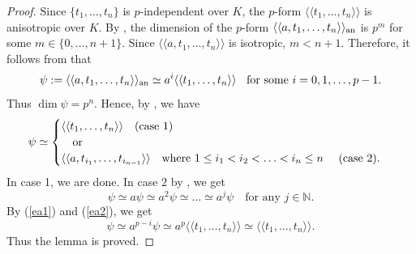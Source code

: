 \documentclass[times,10pt]{amsart}
\newcommand{\N}{\ensuremath{\mathbb{N}}}
\renewcommand{\cong}{\simeq}
\begin{document}
{\begin{proof}
    Since $ \{t_1,\ldots, t_n\}$ is  $p$-independent over $K$, the $p$-form $\langle\langle t_1,\ldots,t_n\rangle\rangle$ is anisotropic over $K$.   By \cite[ Corollary 4.10]{Hoffmann1},  the dimension of the $p$-form $\langle\langle a,t_1,\ldots,t_n\rangle\rangle_{\rm an}$  is  $p^m$ for some $m\in \{0,\ldots,n+1\}$.  Since $\langle\langle a,t_1,\ldots,t_n\rangle\rangle$  is isotropic, $m<n+1$.  Therefore, {it follows from  \cite[Proposition 4.19]{Hoffmann1}  that }  \begin{equation}\label{ea1} \psi:=\langle\langle a, t_1,\ldots, t_n\rangle\rangle_{\rm an}\cong   a^i \langle \langle t_1,\ldots,t_n\rangle\rangle \hspace{2mm} \text{ for some $i=0,1,\ldots,p-1$}.\end{equation}
Thus $\dim \psi=p^n$. Hence, by \cite[Corollary 4.10]{Hoffmann1}, we have \begin{align*}
    \psi\cong \begin{cases}
        \langle\langle t_1,\ldots, t_n\rangle\rangle\quad \text{(case 1)}\\ \quad \text{or} \\
        \langle\langle a, t_{i_1},\ldots, t_{i_{n-1}}\rangle\rangle\quad \text{where $1\leq i_1<i_2<\ldots<i_n\leq n$ \quad (case 2).}
    \end{cases} 
\end{align*} In case 1, we are done.  In case $2$ by \cite[Proposition 4.6(i)]{Hoffmann1}, we get   \begin{equation}\label{ea2} \psi\cong a\psi\cong a^2\psi\cong \ldots \cong a^j\psi\quad \text{for any $j\in \N$.}  \end{equation}
By (\ref{ea1}) and (\ref{ea2}), we get  $$  \psi\cong a^{p-i} \psi\cong a^p\langle\langle t_1,\ldots,t_n\rangle\rangle\cong \langle\langle t_1,\ldots,t_n\rangle\rangle.$$
Thus the lemma is proved.
\end{proof}


}
\end{document}
